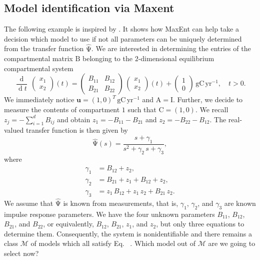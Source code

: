 \documentclass[smallextended]{svjour3}
\makeatletter
\renewcommand*{\eqref}[1]{%
  \hyperref[{#1}]{\textup{\tagform@{\ref*{#1}}}}%
}
\renewcommand{\tens}[1]{\mathrm{#1}}
\renewcommand{\vec}[1]{\mathbf{#1}}
\newcommand{\deriv}[1]{\frac{\operatorname{d}}{\operatorname{d}#1}}
\newcommand{\gC}{\mathrm{gC}}
\newcommand{\yr}{\mathrm{yr}}
\newcommand{\ie}{that is}
\makeatother
\begin{document}
\subsection{Model identification via Maxent}
  \label{sec:model_identification}
  The following example is inspired by \citet[Example~16\,C]{Anderson1983}.
  It shows how MaxEnt can help take a decision which model to use if not all parameters can be uniquely determined from the transfer function $\widehat{\tens{\Psi}}$.
	We are interested in determining the entries of the compartmental matrix $\tens{B}$ belonging to the $2$-dimensional equilibrium compartmental system
	\begin{equation}\label{eqn:opt_example}
        \deriv{t}\,
		\begin{pmatrix} x_1 \\ x_2 \end{pmatrix}(t)
		=
		\begin{pmatrix} B_{11} & B_{12} \\ B_{21} & B_{22} \end{pmatrix}\,
		\begin{pmatrix} x_1 \\ x_2 \end{pmatrix}(t)
		+
		\begin{pmatrix} 1 \\ 0 \end{pmatrix}\,\gC\,\yr^{-1},
		\quad t>0.
	\end{equation}
	We immediately notice $\vec{u}=(1,0)^T\,\gC\,\yr^{-1}$ and $\tens{A}=\tens{I}$.
	Further, we decide to measure the contents of compartment $1$ such that $\tens{C} = (1,0)$.
	We recall $z_j = -\sum_{i=1}^d B_{ij}$ and obtain $z_1 = -B_{11} - B_{21}$ and $z_2 = - B_{22} - B_{12}$.
	The real-valued transfer function is then given by
	\begin{equation}
		\widehat{\tens{\Psi}}(s) = \frac{s + \gamma_1}{s^2+\gamma_2\,s+\gamma_3},
	\end{equation}
	where
	\begin{equation}\label{eqn:measurement_data}
		\begin{aligned}
			\gamma_1 &= B_{12} + z_2,\\
			\gamma_2 &= B_{21} + z_1 + B_{12} + z_2,\\
			\gamma_3 &= z_1\,B_{12} + z_1\,z_2 + B_{21}\,z_2.
		\end{aligned}
	\end{equation}
	We assume that $\widehat{\tens{\Psi}}$ is known from measurements, \ie, $\gamma_1$, $\gamma_2$, and $\gamma_3$ are known impulse response parameters.	
	We have the four unknown parameters $B_{11}$, $B_{12}$, $B_{21}$, and $B_{22}$, or equivalently, $B_{12}$, $B_{21}$, $z_1$, and $z_2$, but only three equations to determine them.
	Consequently, the system is nonidentifiable and there remains a class $\mathcal{M}$ of models which all satisfy Eq.~\eqref{eqn:measurement_data}.
	Which model out of $\mathcal{M}$ are we going to select now?
\end{document}
